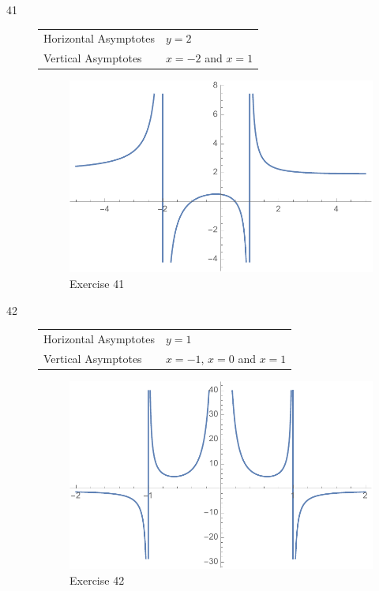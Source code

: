 \documentclass[letterpaper]{exam}
\begin{document}
\begin{description}
      \item[41]
        \begin{tabular}[H]{ll}
          \toprule
          Horizontal Asymptotes & $y = 2$ \\
          Vertical Asymptotes   & $x = -2$ and $x = 1$ \\
          \bottomrule
        \end{tabular}

        \begin{figure}[H]
          \centering
          \includegraphics[scale = 0.5]{ex41.pdf}
          \caption{Exercise 41}
          \label{fig:ex41}
        \end{figure}

      \item[42]
        \begin{tabular}[H]{ll}
          \toprule
          Horizontal Asymptotes & $y = 1$ \\
          Vertical Asymptotes   & $x = -1$, $x = 0$ and $x = 1$ \\
          \bottomrule
        \end{tabular}

        \begin{figure}[H]
          \centering
          \includegraphics[scale = 0.5]{ex42.pdf}
          \caption{Exercise 42}
          \label{fig:ex42}
        \end{figure}


\end{description}
\end{document}
